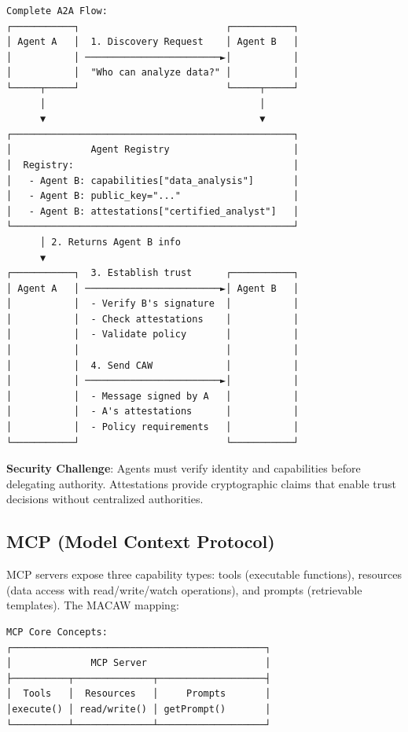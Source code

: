 {{\begin{verbatim}
Complete A2A Flow:
┌───────────┐                          ┌───────────┐
│ Agent A   │  1. Discovery Request    │ Agent B   │
│           │ ────────────────────────►│           │
│           │  "Who can analyze data?" │           │
└─────┬─────┘                          └─────┬─────┘
      │                                      │
      ▼                                      ▼
┌──────────────────────────────────────────────────┐
│              Agent Registry                      │
│  Registry:                                       │
│   - Agent B: capabilities["data_analysis"]       │
│   - Agent B: public_key="..."                    │
│   - Agent B: attestations["certified_analyst"]   │
└──────────────────────────────────────────────────┘
      │ 2. Returns Agent B info
      ▼
┌───────────┐  3. Establish trust      ┌───────────┐
│ Agent A   │ ────────────────────────►│ Agent B   │
│           │  - Verify B's signature  │           │
│           │  - Check attestations    │           │
│           │  - Validate policy       │           │
│           │                          │           │
│           │  4. Send CAW             │           │
│           │ ────────────────────────►│           │
│           │  - Message signed by A   │           │
│           │  - A's attestations      │           │
│           │  - Policy requirements   │           │
└───────────┘                          └───────────┘
\end{verbatim}}

\textbf{Security Challenge}: Agents must verify identity and capabilities before delegating authority. Attestations provide cryptographic claims that enable trust decisions without centralized authorities.

\subsection*{MCP (Model Context Protocol)}

MCP servers expose three capability types: tools (executable functions), resources (data access with read/write/watch operations), and prompts (retrievable templates). The MACAW mapping:

{\tiny
\begin{verbatim}
MCP Core Concepts:
┌─────────────────────────────────────────────┐
│              MCP Server                     │
├──────────┬──────────────┬───────────────────┤
│  Tools   │  Resources   │     Prompts       │
│execute() │ read/write() │ getPrompt()       │
└──────────┴──────────────┴───────────────────┘


\end{verbatim}}}
